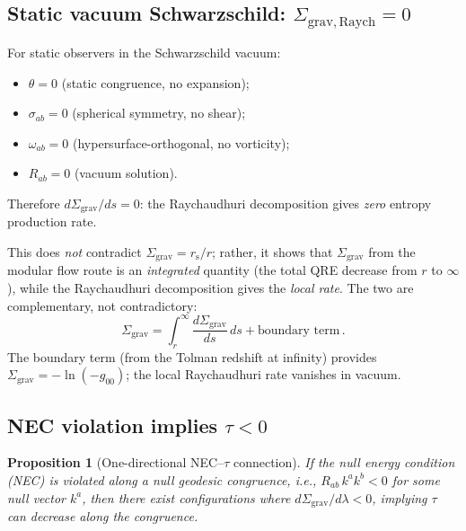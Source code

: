 \documentclass[aps,prd,preprint,superscriptaddress,longbibliography]{revtex4-2}
\newtheorem{proposition}[theorem]{Proposition}
\newcommand{\tauasym}{\tau}
\newcommand{\rs}{r_{\mathrm{s}}}
\newcommand{\Sgrav}{\Sigma_{\mathrm{grav}}}
\begin{document}
\subsection{Static vacuum Schwarzschild: $\Sigma_{\mathrm{grav,Raych}} = 0$}

For static observers in the Schwarzschild vacuum:
\begin{itemize}
\item $\theta = 0$ (static congruence, no expansion);
\item $\sigma_{ab} = 0$ (spherical symmetry, no shear);
\item $\omega_{ab} = 0$ (hypersurface-orthogonal, no vorticity);
\item $R_{ab} = 0$ (vacuum solution).
\end{itemize}
Therefore $d\Sgrav/ds = 0$: the Raychaudhuri decomposition gives
\emph{zero} entropy production rate.

This does \emph{not} contradict $\Sgrav = \rs/r$; rather, it shows
that $\Sgrav$ from the modular flow route is an \emph{integrated}
quantity (the total QRE decrease from $r$ to $\infty$), while the
Raychaudhuri decomposition gives the \emph{local rate}.  The two are
complementary, not contradictory:
\begin{equation}
  \Sgrav = \int_r^\infty \frac{d\Sgrav}{ds}\,ds + \text{boundary term}\,.
  \label{eq:integrated_vs_local}
\end{equation}
The boundary term (from the Tolman redshift at infinity) provides
$\Sgrav = -\ln(-g_{00})$; the local Raychaudhuri rate vanishes in
vacuum.

\subsection{NEC violation implies $\tauasym < 0$}

\begin{proposition}[One-directional NEC--$\tauasym$ connection]
If the null energy condition (NEC) is violated along a null geodesic
congruence, i.e., $R_{ab}\,k^a k^b < 0$ for some null vector $k^a$,
then there exist configurations where $d\Sgrav/d\lambda < 0$, implying
$\tauasym$ can decrease along the congruence.
\end{proposition}
\end{document}
